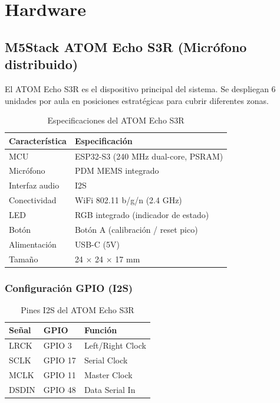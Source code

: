 \documentclass[12pt,a4paper]{report}
\begin{document}
\chapter{Hardware}

\section{M5Stack ATOM Echo S3R (Micr\'ofono distribuido)}

El ATOM Echo S3R es el dispositivo principal del sistema. Se despliegan 6 unidades por aula en posiciones estrat\'egicas para cubrir diferentes zonas.

\begin{table}[H]
\centering
\begin{tabularx}{\textwidth}{lX}
\toprule
\textbf{Caracter\'istica} & \textbf{Especificaci\'on} \\
\midrule
MCU & ESP32-S3 (240 MHz dual-core, PSRAM) \\
Micr\'ofono & PDM MEMS integrado \\
Interfaz audio & I2S \\
Conectividad & WiFi 802.11 b/g/n (2.4 GHz) \\
LED & RGB integrado (indicador de estado) \\
Bot\'on & Bot\'on A (calibraci\'on / reset pico) \\
Alimentaci\'on & USB-C (5V) \\
Tama\~no & 24 $\times$ 24 $\times$ 17 mm \\
\bottomrule
\end{tabularx}
\caption{Especificaciones del ATOM Echo S3R}
\end{table}

\subsection{Configuraci\'on GPIO (I2S)}

\begin{table}[H]
\centering
\begin{tabular}{lll}
\toprule
\textbf{Se\~nal} & \textbf{GPIO} & \textbf{Funci\'on} \\
\midrule
LRCK & GPIO 3 & Left/Right Clock \\
SCLK & GPIO 17 & Serial Clock \\
MCLK & GPIO 11 & Master Clock \\
DSDIN & GPIO 48 & Data Serial In \\
\bottomrule
\end{tabular}
\caption{Pines I2S del ATOM Echo S3R}
\end{table}
\end{document}
